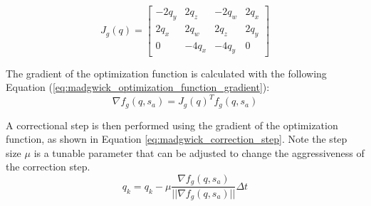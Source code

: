 \documentclass[bare_jrnl_transmag]{subfiles}
\begin{document}
\begin{equation}
    J_g(q) =
    \begin{bmatrix}
    -2q_y & 2q_z & -2q_w & 2q_x \\
    2q_x & 2q_w & 2q_z & 2q_y \\
    0 & -4q_x & -4q_y & 0
\end{bmatrix}
    \label{eq:madgwick_optimization_function_jacobian}
\end{equation}

The gradient of the optimization function is calculated with the following Equation (\ref{eq:madgwick_optimization_function_gradient}):
\begin{equation}
    \nabla f_g(q, s_a) = J_g(q)^T f_g(q, s_a)
    \label{eq:madgwick_optimization_function_gradient}
\end{equation}

A correctional step is then performed using the gradient of the optimization function, as shown in Equation \ref{eq:madgwick_correction_step}. Note the step size $\mu$ is a tunable parameter that can be adjusted to change the aggressiveness of the correction step.
\begin{equation}
    q_{k} = q_{k} - \mu \frac{\nabla f_g(q, s_a)}{||\nabla f_g(q, s_a)||}\Delta t
    \label{eq:madgwick_correction_step}
\end{equation}
\end{document}
